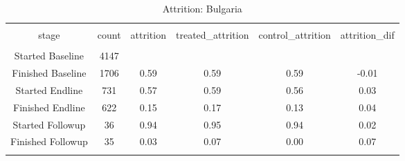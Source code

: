 
\begin{table}[H] \centering 
  \caption{Attrition: Bulgaria} 
  \label{tbl:Attrition: Bulgaria} 
\begin{tabular}{@{\extracolsep{5pt}} cccccc} 
\\[-1.8ex]\hline 
\hline \\[-1.8ex] 
stage & count & attrition & treated\_attrition & control\_attrition & attrition\_dif \\ 
\hline \\[-1.8ex] 
Started Baseline & 4147 &  &  &  &  \\ 
Finished Baseline & 1706 & 0.59 & 0.59 & 0.59 & -0.01 \\ 
Started Endline &  731 & 0.57 & 0.59 & 0.56 &  0.03 \\ 
Finished Endline &  622 & 0.15 & 0.17 & 0.13 &  0.04 \\ 
Started Followup &   36 & 0.94 & 0.95 & 0.94 &  0.02 \\ 
Finished Followup &   35 & 0.03 & 0.07 & 0.00 &  0.07 \\ 
\hline \\[-1.8ex] 
\end{tabular} 
\end{table} 
